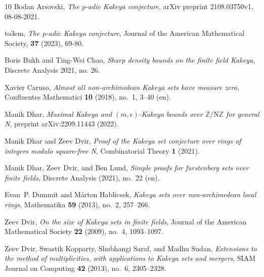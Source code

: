 \documentclass{aic}
\begin{document}

\begin{thebibliography}{10}
\providecommand{\bysame}{\leavevmode\hbox to3em{\hrulefill}\thinspace}
\providecommand{\MR}{\relax\ifhmode\unskip\space\fi MR }
\providecommand{\MRhref}[2]{%
  \href{http://www.ams.org/mathscinet-getitem?mr=#1}{#2}
}
\providecommand{\href}[2]{#2}
Bodan Arsovski, \emph{The p-adic {K}akeya conjecture}, arXiv preprint
  2108.03750v1, 08-08-2021.

\bysame, \emph{The p-adic {K}akeya conjecture}, Journal of the American Mathematical Society, \textbf{37} (2023), 69-80.



Boris Bukh and Ting-Wei Chao, \emph{Sharp density bounds on the finite field
  {K}akeya}, Discrete Analysis 2021, no. 26.

Xavier Caruso, \emph{Almost all non-archimedean {K}akeya sets have measure
  zero}, Confluentes Mathematici \textbf{10} (2018), no.~1, 3--40 (en).

Manik Dhar, \emph{{Maximal Kakeya and $(m,\epsilon)$-Kakeya bounds over
  $\mathbb{Z}/\text{{N}}\mathbb{Z}$ for general N}}, preprint arXiv:2209.11443
  (2022).

Manik Dhar and Zeev Dvir, \emph{Proof of the {K}akeya set conjecture over rings
  of integers modulo square-free {N}}, Combinatorial Theory \textbf{1} (2021).

Manik Dhar, Zeev Dvir, and Ben Lund, \emph{Simple proofs for furstenberg sets
  over finite fields}, Discrete Analysis (2021), no.~22 (en).

Evan~P. Dummit and Márton Hablicsek, \emph{Kakeya sets over non-archimedean
  local rings}, Mathematika \textbf{59} (2013), no.~2, 257–266.

Zeev Dvir, \emph{On the size of {K}akeya sets in finite fields}, Journal of the
  American Mathematical Society \textbf{22} (2009), no.~4, 1093--1097.

Zeev Dvir, Swastik Kopparty, Shubhangi Saraf, and Madhu Sudan, \emph{Extensions
  to the method of multiplicities, with applications to {K}akeya sets and
  mergers}, SIAM Journal on Computing \textbf{42} (2013), no.~6, 2305--2328.


\end{thebibliography}
\end{document}
